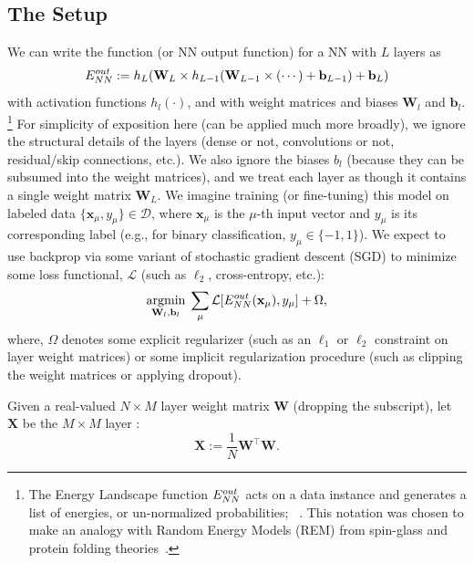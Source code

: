 \subsection{The \HTSR Setup}
\label{sxn:htsr_setup}

We can write the \EnergyLandscape function 
(or NN output function) for a 
NN with $L$ layers as
\begin{equation}
\label{eqn:dnn_energy}
E^{out}_{NN}:=h_{L}(\mathbf{W}_{L}\times h_{L-1}(\mathbf{W}_{L-1}\times(\cdots)+\mathbf{b}_{L-1})+\mathbf{b}_{L}) 
\end{equation}
with activation functions $h_{l}(\cdot)$, and with weight matrices and biases $\mathbf{W}_{l}$ and $\mathbf{b}_{l}$.%
\footnote{The Energy Landscape function $E^{out}_{NN}$ acts on a data instance and generates a list of energies, or un-normalized probabilities;
~\cite{MM18_TR_JMLRversion}.
This notation was chosen to make an analogy with Random Energy Models (REM)
from spin-glass and protein folding theories~\cite{DerridaREM1981, BryngelsonWolynesPNAS1987}.
}
For simplicity of exposition here (\HTSR can be applied much more broadly), we ignore the structural details of the layers (dense or not, convolutions or not, residual/skip connections, etc.).
We also ignore the biases $b_{l}$ (because they can be subsumed into the weight matrices),
and we treat each layer as though it contains a single weight matrix $\mathbf{W}_{L}$.
We imagine training (or fine-tuning) this model on labeled data $\{\mathbf{x}_{\mu},y_{\mu}\}\in\mathcal{D}$, where $ \mathbf{x}_\mu $ is the $\mu$-th input vector and $y_\mu$ is its corresponding label (e.g., for binary classification, $y_{\mu}\in\{-1,1\}$).
We expect to use backprop via some variant of stochastic gradient descent (SGD) to minimize some loss functional, $\mathcal{L}$ (such as $\ell_2$, cross-entropy, etc.):  
\begin{equation}
\underset{\mathbf{W}_{l},\mathbf{b}_{l}}{\text{argmin}}\;\sum_{\mu}\mathcal{L}[E^{out}_{NN}(\mathbf{x}_{\mu}),y_{\mu}]+\Omega ,
\label{eqn:dnn_opt}
\end{equation}
where, $\Omega$ denotes some explicit regularizer (such as an $\ell_1$ or $\ell_2$ constraint on layer weight matrices) or some implicit regularization procedure (such as clipping the weight matrices or applying dropout).

Given a real-valued $N\times M$ layer weight matrix $\mathbf{W}$ (dropping the subscript), let $\mathbf{X}$ be the $M \times M$ layer \emph{\CorrelationMatrix}:
\begin{equation}
\mathbf{X}:=\dfrac{1}{N}\mathbf{W}^{\top}\mathbf{W} .
\label{eqn:X}
\end{equation}

